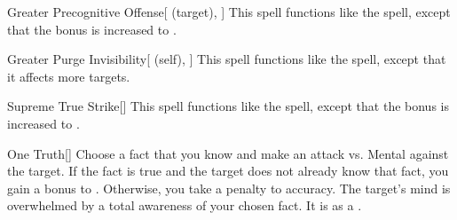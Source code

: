 \lowercase{\hypertarget{spell:Greater Precognitive Offense}{}}\label{spell:Greater Precognitive Offense}
\begin{attuneability}[\nth{5}]{\hypertarget{spell:Greater Precognitive Offense}{Greater Precognitive Offense}}[ (target), ]
This spell functions like the  spell, except that the bonus is increased to .
\end{attuneability}
\vspace{0.25em}



\lowercase{\hypertarget{spell:Greater Purge Invisibility}{}}\label{spell:Greater Purge Invisibility}
\begin{attuneability}[\nth{5}]{\hypertarget{spell:Greater Purge Invisibility}{Greater Purge Invisibility}}[ (self), ]
This spell functions like the  spell, except that it affects more targets.
\end{attuneability}
\vspace{0.25em}



\lowercase{\hypertarget{spell:Supreme True Strike}{}}\label{spell:Supreme True Strike}
\begin{freeability}[\nth{5}]{\hypertarget{spell:Supreme True Strike}{Supreme True Strike}}[]
This spell functions like the  spell, except that the bonus is increased to .
\end{freeability}
\vspace{0.25em}



\lowercase{\hypertarget{spell:One Truth}{}}\label{spell:One Truth}
\begin{freeability}[\nth{7}]{\hypertarget{spell:One Truth}{One Truth}}[]
Choose a fact that you know and make an attack vs. Mental against the target.
If the fact is true and the target does not already know that fact, you gain a  bonus to .
Otherwise, you take a  penalty to accuracy.
\hit The target's mind is overwhelmed by a total awareness of your chosen fact.
It is  as a .
\end{freeability}
\vspace{0.25em}



